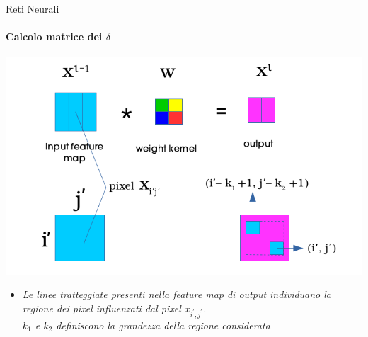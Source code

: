 \documentclass[
 ]{beamer}
\begin{document}
\begin{frame}{Reti Neurali}
    \framesubtitle{Calcolo matrice dei $\delta$} 
    
    \begin{center}
      \includegraphics[scale = 0.4]{back_conv1.png}
    \end{center}
  
    \smallskip
    
    \begin{itemize}
        \setlength\itemsep{1em}
        \item[] \large \emph{Le linee tratteggiate presenti nella feature map di output individuano la regione dei pixel influenzati dal pixel $x_{i^{\prime},j^{\prime}}$. \\ $k_1$ e $k_2$ definiscono la grandezza della regione considerata}
    \end{itemize}
\end{frame}
\end{document}
